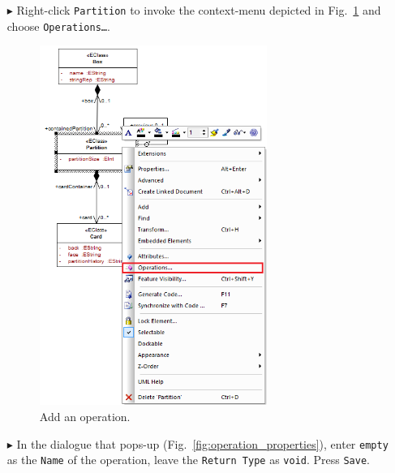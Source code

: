 \begin{enumerate}
\item[$\blacktriangleright$] Right-click \texttt{Partition} to invoke the context-menu depicted in Fig.~\ref{fig:add_operation} and choose \texttt{Operations\ldots}.

\begin{figure}[htbp]
	\centering
  \includegraphics[width=0.7\textwidth]{pics/memBoxBilder/memBox35.png}
	\caption{Add an operation.}
	\label{fig:add_operation}
\end{figure}

\item[$\blacktriangleright$] In the dialogue that pops-up (Fig.~\ref{fig:operation_properties}), enter \texttt{empty} as the \texttt{Name} of the operation, leave the \texttt{Return Type} as \texttt{void}.  Press \texttt{Save}.


\end{enumerate}
